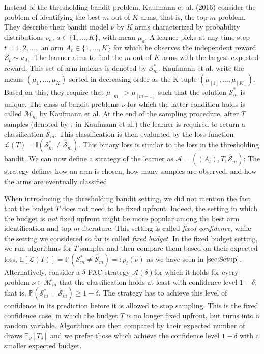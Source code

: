 \documentclass[11pt,]{article}
\begin{document}
Instead of the thresholding bandit problem, Kaufmann et al. (2016)
consider the problem of identifying the best \(m\) out of \(K\) arms,
that is, the top-\(m\) problem. They describe their bandit model \(\nu\)
by \(K\) arms characterized by probability distributions \(\nu_a\),
\(a \in \{1,...,K\}\), with mean \(\mu_a\). A learner picks at any time
step \(t=1,2,...,\) an arm \(A_t \in \{1,...,K\}\) for which he observes
the independent reward \(Z_{t} \sim \nu_{A_t}\). The learner aims to
find the \(m\) out of \(K\) arms with the largest expected reward. This
set of arm indexes is denoted by \(\mathcal{S}_m^*\). Kaufmann et al.
write the means \((\mu_{1}, ..., \mu_{K})\) sorted in decreasing order
as the K-tuple \((\mu_{[1]}, ..., \mu_{[K]})\). Based on this, they
require that \(\mu_{[m]} > \mu_{[m+1]}\) such that the solution
\(\mathcal{S}_m^*\) is unique. The class of bandit problems \(\nu\) for
which the latter condition holds is called \(\mathcal{M}_m\) by Kaufmann
et al. At the end of the sampling procedure, after \(T\) samples
(denoted by \(\tau\) in Kaufmann et al.) the learner is required to
return a classification \(\hat{\mathcal{S}}_m\). This classification is
then evaluated by the loss function
\(\mathcal{L}(T) = \mathbb{I}(\mathcal{S}^*_m \neq \hat{\mathcal{S}}_m)\).
This binary loss is similar to the loss in the thresholding bandit. We
can now define a strategy of the learner as
\(\mathcal{A} = ((A_t), T, \hat{\mathcal{S}}_m)\): The strategy defines
how an arm is chosen, how many samples are observed, and how the arms
are eventually classified.

When introducing the thresholding bandit setting, we did not mention the
fact that the budget \(T\) does not need to be fixed upfront. Indeed,
the setting in which the budget is \emph{not} fixed upfront might be
more popular among the best arm identification and top-\(m\) literature.
This setting is called \emph{fixed confidence}, while the setting we
considered so far is called \emph{fixed budget}. In the fixed budget
setting, we run algorithms for \(T\) samples and then compare them based
on their expected loss,
\(\mathbb{E}[\mathcal{L}(T)] = \mathbb{P}(\mathcal{S}^*_m \neq \hat{\mathcal{S}}_m) =: p_t(\nu)\)
as we have seen in \(\autoref{sec:Setup}\). Alternatively, consider a
\(\delta\)-PAC strategy \(\mathcal{A}(\delta)\)for which it holds for
every problem \(\nu \in \mathcal{M}_m\) that the classification holds at
least with confidence level \(1-\delta\), that is,
\(\mathbb{P}(\mathcal{S}^*_m = \hat{\mathcal{S}}_m) \geq 1-\delta\). The
strategy has to achieve this level of confidence in its prediction
before it is allowed to stop sampling. This is the fixed confidence
case, in which the budget \(T\) is no longer fixed upfront, but turns
into a random variable. Algorithms are then compared by their expected
number of draws \(\mathbb{E}_{\nu}[T_{\delta}]\) and we prefer those
which achieve the confidence level \(1-\delta\) with a smaller expected
budget.
\end{document}
